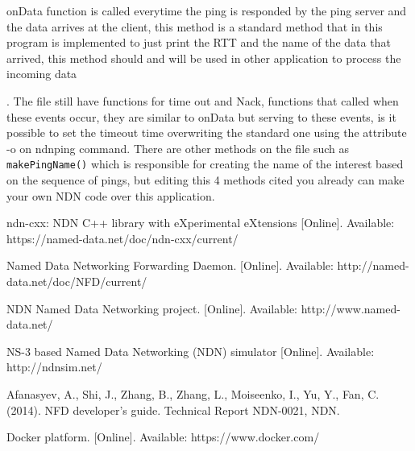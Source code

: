 \documentclass[10pt,letterpaper,extrafontsizes]{memoir}
\begin{document}
\clearpage
onData function is called everytime the ping is responded by the ping server and the data arrives at the client, this method is a standard method that in this program is implemented to just print the RTT and the name of the data that arrived, this method should and will be used in other application to process the incoming data \par.
The file still have functions for time out and Nack, functions that called when these events occur, they are similar to onData but serving to these events, is it possible to set the timeout time overwriting the standard one using the attribute -o on ndnping command. There are other methods on the file such as \texttt{makePingName()} which is responsible for creating the name of the interest based on the sequence of pings, but editing this 4 methods cited you already can make your own NDN code over this application.






\begin{thebibliography}{99}

ndn-cxx: NDN C++ library with eXperimental eXtensions [Online]. Available:
https://named-data.net/doc/ndn-cxx/current/

Named Data Networking Forwarding Daemon. [Online]. Available:
http://named-data.net/doc/NFD/current/

NDN Named Data Networking project. [Online]. Available:
http://www.named-data.net/


NS-3 based Named Data Networking (NDN) simulator 
[Online]. Available:
http://ndnsim.net/

Afanasyev, A., Shi, J., Zhang, B., Zhang, L., Moiseenko, I., Yu, Y., Fan, C. (2014). NFD developer’s guide. Technical Report NDN-0021, NDN.

Docker platform.
[Online]. Available:
https://www.docker.com/

\end{thebibliography}
  
\end{document}
